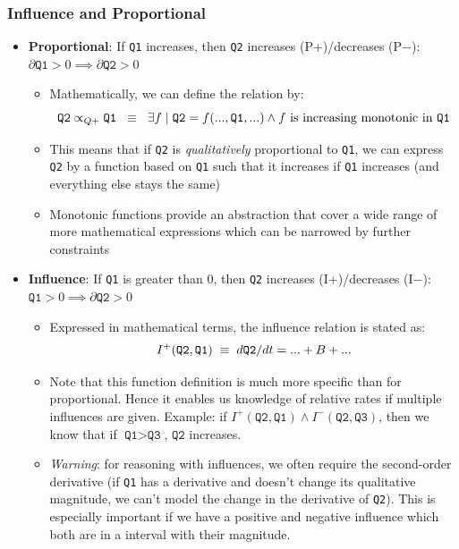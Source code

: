 \subsubsection{Influence and Proportional}
\begin{itemize}
	\item \textbf{Proportional}: If \texttt{Q1} increases, then \texttt{Q2} increases (P+)/decreases (P$-$):
	$\partial \texttt{Q1}>0\implies \partial \texttt{Q2}>0$
	\begin{itemize}
		\item Mathematically, we can define the relation by:
		$$\texttt{Q2}\propto_{Q+}\texttt{Q1} \hspace{2mm}\equiv\hspace{2mm} \exists f\hspace{1mm}|\hspace{1mm}\texttt{Q2} = f(...,\texttt{Q1},...) \wedge f \text{ is increasing monotonic in }\texttt{Q1}$$
		\item This means that if \texttt{Q2} is \textit{qualitatively} proportional to \texttt{Q1}, we can express \texttt{Q2} by a function based on \texttt{Q1} such that it increases if \texttt{Q1} increases (and everything else stays the same)
		\item Monotonic functions provide an abstraction that cover a wide range of more mathematical expressions which can be narrowed by further constraints
	\end{itemize}
	\item \textbf{Influence}: If \texttt{Q1} is greater than 0, then \texttt{Q2} increases (I+)/decreases (I$-$):
	$\texttt{Q1} > 0\implies \partial \texttt{Q2}>0$
	\begin{itemize}
		\item Expressed in mathematical terms, the influence relation is stated as:
		$$I^{+}(\texttt{Q2},\texttt{Q1})\hspace{1mm} \equiv\hspace{1mm} d\texttt{Q2}/dt=...+B+...$$
		\item Note that this function definition is much more specific than for proportional. Hence it enables us knowledge of relative rates if multiple influences are given. Example: if $I^{+}(\texttt{Q2},\texttt{Q1})\wedge I^{-}(\texttt{Q2},\texttt{Q3})$, then we know that if $\texttt{Q1}>\texttt{Q3}$, $\texttt{Q2}$ increases.
		\item \textit{Warning}: for reasoning with influences, we often require the second-order derivative (if \texttt{Q1} has a derivative and doesn't change its qualitative magnitude, we can't model the change in the derivative of \texttt{Q2}). This is especially important if we have a positive and negative influence which both are in a interval with their magnitude.

\end{itemize}
\end{itemize}
